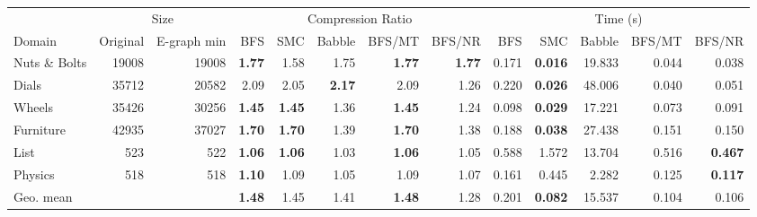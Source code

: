 \begin{tabular}{l r r rrrrr rrrrr}
\toprule
& \multicolumn{2}{c}{Size} & \multicolumn{5}{c}{Compression Ratio} & \multicolumn{5}{c}{Time (s)} \\
\cmidrule(lr){2-3} \cmidrule(lr){4-8} \cmidrule(lr){9-13}
Domain & Original & E-graph min & BFS & SMC & Babble & BFS/MT & BFS/NR & BFS & SMC & Babble & BFS/MT & BFS/NR \\
\midrule
Nuts \& Bolts & 19008 & 19008 & \textbf{1.77} & 1.58 & 1.75 & \textbf{1.77} & \textbf{1.77} & 0.171 & \textbf{0.016} & 19.833 & 0.044 & 0.038 \\
Dials & 35712 & 20582 & 2.09 & 2.05 & \textbf{2.17} & 2.09 & 1.26 & 0.220 & \textbf{0.026} & 48.006 & 0.040 & 0.051 \\
Wheels & 35426 & 30256 & \textbf{1.45} & \textbf{1.45} & 1.36 & \textbf{1.45} & 1.24 & 0.098 & \textbf{0.029} & 17.221 & 0.073 & 0.091 \\
Furniture & 42935 & 37027 & \textbf{1.70} & \textbf{1.70} & 1.39 & \textbf{1.70} & 1.38 & 0.188 & \textbf{0.038} & 27.438 & 0.151 & 0.150 \\
List & 523 & 522 & \textbf{1.06} & \textbf{1.06} & 1.03 & \textbf{1.06} & 1.05 & 0.588 & 1.572 & 13.704 & 0.516 & \textbf{0.467} \\
Physics & 518 & 518 & \textbf{1.10} & 1.09 & 1.05 & 1.09 & 1.07 & 0.161 & 0.445 & 2.282 & 0.125 & \textbf{0.117} \\
\midrule
Geo. mean &  &  & \textbf{1.48} & 1.45 & 1.41 & \textbf{1.48} & 1.28 & 0.201 & \textbf{0.082} & 15.537 & 0.104 & 0.106 \\
\bottomrule
\end{tabular}
